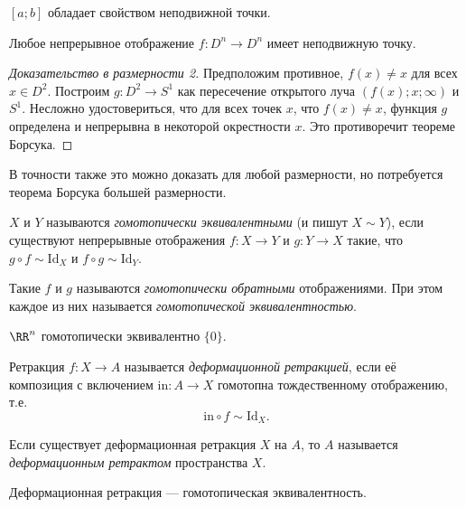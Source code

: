 \documentclass[12pt,a4paper]{article}
\newcommand{\Id}{\ensuremath{\mathrm{Id}}\xspace}
\newcommand{\incl}{\mathrm{in}}
\begin{document}
    \begin{example}
        $[a; b]$ обладает свойством неподвижной точки.
    \end{example}

    \begin{theorem}[Брауэра]
        Любое непрерывное отображение $f: D^n \to D^n$ имеет неподвижную точку.
    \end{theorem}

    \begin{proof}[Доказательство в размерности 2]
        Предположим противное, $f(x) \neq x$ для всех $x \in D^2$. Построим $g: D^2 \to S^1$ как пересечение открытого луча $(f(x); x; \infty)$ и $S^1$. Несложно удостовериться, что для всех точек $x$, что $f(x) \neq x$, функция $g$ определена и непрерывна в некоторой окрестности $x$. Это противоречит теореме Борсука.
    \end{proof}

    \begin{remark}
        В точности также это можно доказать для любой размерности, но потребуется теорема Борсука большей размерности.
    \end{remark}

    \begin{definition}
        $X$ и $Y$ называются \emph{гомотопически эквивалентными} (и пишут $X \sim Y$), если существуют непрерывные отображения $f: X \to Y$ и $g: Y \to X$ такие, что $g \circ f \sim \Id_X$ и $f \circ g \sim \Id_Y$.

        Такие $f$ и $g$ называются \emph{гомотопически обратными} отображениями. При этом каждое из них называется \emph{гомотопической эквивалентностью}.
    \end{definition}

    \begin{example}
        $\RR^n$ гомотопически эквивалентно $\{0\}$.
    \end{example}

    \begin{definition}
        Ретракция $f: X \to A$ называется \emph{деформационной ретракцией}, если её композиция с включением $\incl: A \to X$ гомотопна тождественному отображению, т.е.
        \[\incl \circ f \sim \Id_X.\]

        Если существует деформационная ретракция $X$ на $A$, то $A$ называется \emph{деформационным ретрактом} пространства $X$.
    \end{definition}

    \begin{theorem}
        Деформационная ретракция --- гомотопическая эквивалентность.
    \end{theorem}
\end{document}
